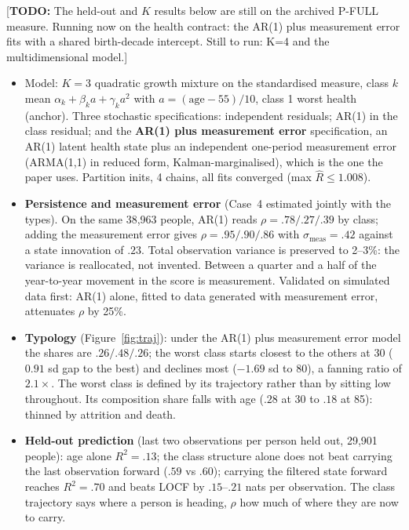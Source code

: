 \documentclass[11pt]{article}
\newcommand{\todo}[1]{\textcolor{red!75!black}{[\textbf{TODO:} #1]}}
\begin{document}
\begin{table}[H]\centering\footnotesize

\caption{The AR(1) plus measurement error mixture against the K-means types, with the class persistence and the measurement-error scale.}
\label{tab:bayesssm}
\end{table}

\todo{The held-out and $K$ results below are still on the archived P-FULL measure. Running now on the health contract: the AR(1) plus measurement error fits with a shared birth-decade intercept. Still to run: K=4 and the multidimensional model.}

\begin{itemize}
\item Model: $K=3$ quadratic growth mixture on the standardised measure, class $k$ mean $\alpha_k+\beta_ka+\gamma_ka^2$ with $a=(\text{age}-55)/10$, class 1 worst health (anchor). Three stochastic specifications: independent residuals; AR(1) in the class residual; and the \textbf{AR(1) plus measurement error} specification, an AR(1) latent health state plus an independent one-period measurement error (ARMA(1,1) in reduced form, Kalman-marginalised), which is the one the paper uses. Partition inits, 4 chains, all fits converged (max $\hat R\le1.008$).
\item \textbf{Persistence and measurement error} (Case~4 estimated jointly with the types). On the same 38,963 people, AR(1) reads $\rho=.78/.27/.39$ by class; adding the measurement error gives $\rho=.95/.90/.86$ with $\sigma_{\text{meas}}=.42$ against a state innovation of $.23$. Total observation variance is preserved to 2--3\%: the variance is reallocated, not invented. Between a quarter and a half of the year-to-year movement in the score is measurement. Validated on simulated data first: AR(1) alone, fitted to data generated with measurement error, attenuates $\rho$ by 25\%.
\item \textbf{Typology} (Figure~\ref{fig:traj}): under the AR(1) plus measurement error model the shares are $.26/.48/.26$; the worst class starts closest to the others at 30 ($0.91$ sd gap to the best) and declines most ($-1.69$ sd to 80), a fanning ratio of $2.1\times$. The worst class is defined by its trajectory rather than by sitting low throughout. Its composition share falls with age ($.28$ at 30 to $.18$ at 85): thinned by attrition and death.
\item \textbf{Held-out prediction} (last two observations per person held out, 29,901 people): age alone $R^2=.13$; the class structure alone does not beat carrying the last observation forward ($.59$ vs $.60$); carrying the filtered state forward reaches $R^2=.70$ and beats LOCF by $.15$--$.21$ nats per observation. The class trajectory says where a person is heading, $\rho$ how much of where they are now to carry.
\end{itemize}
\end{document}
